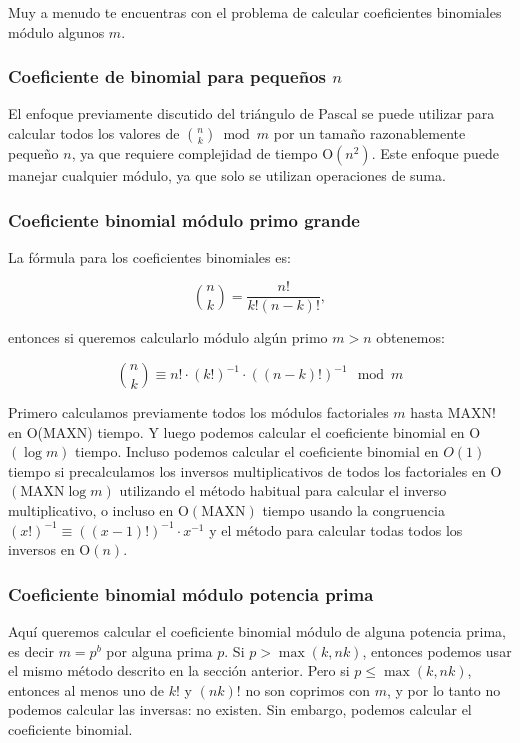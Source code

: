 Muy a menudo te encuentras con el problema de calcular coeficientes binomiales módulo algunos $m$.

\subsubsection{Coeficiente de binomial para pequeños $n$}

El enfoque previamente discutido del triángulo de Pascal se puede utilizar para calcular todos los valores de $\binom n  k  \bmod m$ por un tamaño razonablemente pequeño $n$, ya que requiere complejidad de tiempo O$(n^2)$. Este enfoque puede manejar cualquier módulo, ya que solo se utilizan operaciones de suma.

\subsubsection{Coeficiente binomial módulo primo grande}

La fórmula para los coeficientes binomiales es:

$$\binom n k = \frac {n!} {k!(n-k)!},$$

entonces si queremos calcularlo módulo algún primo $m > n$ obtenemos:

$$\binom n k \equiv n! \cdot (k!)^{-1} \cdot ((n-k)!)^{-1} \mod m$$

Primero calculamos previamente todos los módulos factoriales $m$ hasta $\text{MAXN}!$ en O($\text{MAXN}$) tiempo. Y luego podemos calcular el coeficiente binomial en O$(\log m)$ tiempo. 
Incluso podemos calcular el coeficiente binomial en $O(1)$ tiempo si precalculamos los inversos multiplicativos de todos los factoriales en O$(\text{MAXN} \log m)$ utilizando el método habitual 
para calcular el inverso multiplicativo, o incluso en O$(\text{MAXN})$ tiempo usando la congruencia $(x!)^{-1} \equiv ((x-1)!)^{-1} \cdot x^{-1}$ y el método para calcular todas todos los inversos en O$(n)$.

\subsubsection{Coeficiente binomial módulo potencia prima}

Aquí queremos calcular el coeficiente binomial módulo de alguna potencia prima, es decir $m = p^b$ por alguna prima $p$. Si $p > \max(k,nk)$, entonces podemos usar el mismo método descrito en la sección anterior. Pero si $p \le \max(k, nk)$, entonces al menos uno de $k!$ y $(nk)!$ no son coprimos con $m$, y por lo tanto no podemos calcular las inversas: no existen. Sin embargo, podemos calcular el coeficiente binomial.

